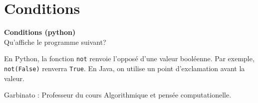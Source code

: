 \newpage

\section{Conditions}

\begin{Exercice}[5 minutes] \textbf{Conditions (python)}\\
    Qu'affiche le programme suivant? \\
    
    

     \begin{conseil}
        En Python, la fonction \lstinline{not} renvoie l'opposé d'une valeur booléenne. Par exemple, \lstinline{not(False)} renverra \lstinline{True}. En Java, on utilise un point d'exclamation avant la valeur.
     \end{conseil}
     \begin{solution}
        Garbinato : Professeur du cours Algorithmique et pensée computationelle.
     \end{solution}   
 \end{Exercice}



